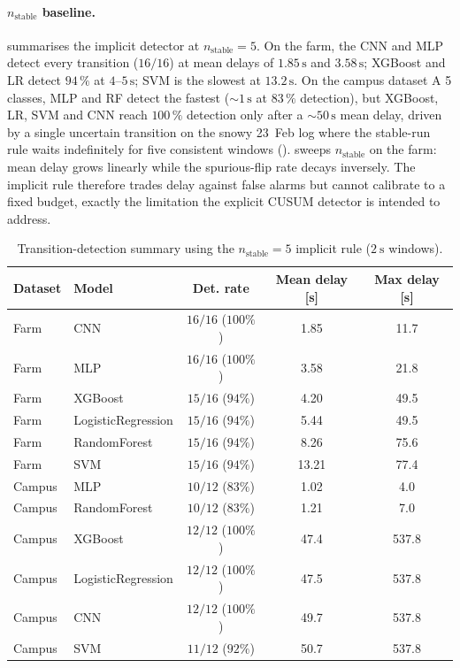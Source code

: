 \paragraph{$n_{\text{stable}}$ baseline.}  summarises the implicit detector at $n_{\text{stable}} = 5$. On the farm, the CNN and MLP detect every transition ($16/16$) at mean delays of $1.85\,\text{s}$ and $3.58\,\text{s}$; XGBoost and LR detect $94\,\%$ at $4$--$5\,\text{s}$; SVM is the slowest at $13.2\,\text{s}$. On the campus dataset A 5 classes, MLP and RF detect the fastest ($\sim 1\,\text{s}$ at $83\,\%$ detection), but XGBoost, LR, SVM and CNN reach $100\,\%$ detection only after a $\sim 50\,\text{s}$ mean delay, driven by a single uncertain transition on the snowy 23~Feb log where the stable-run rule waits indefinitely for five consistent windows ().  sweeps $n_{\text{stable}}$ on the farm: mean delay grows linearly while the spurious-flip rate decays inversely. The implicit rule therefore trades delay against false alarms but cannot calibrate to a fixed budget, exactly the limitation the explicit CUSUM detector is intended to address.

\vspace{-4mm}
\begin{table}[H]
\centering
\small
\caption{Transition-detection summary using the $n_{\text{stable}} = 5$ implicit rule ($\SI{2}{\second}$ windows).}
\label{tab:transition_nstable}
\begin{tabular}{llccc}
\toprule
\textbf{Dataset} & \textbf{Model} & \textbf{Det. rate} &
\textbf{Mean delay [s]} & \textbf{Max delay [s]} \\
\midrule
Farm    & CNN                & $16/16$ ($100\%$) & 1.85  & 11.7  \\
Farm    & MLP                & $16/16$ ($100\%$) & 3.58  & 21.8  \\
Farm    & XGBoost            & $15/16$ ($94\%$)  & 4.20  & 49.5  \\
Farm    & LogisticRegression & $15/16$ ($94\%$)  & 5.44  & 49.5  \\
Farm    & RandomForest       & $15/16$ ($94\%$)  & 8.26  & 75.6  \\
Farm    & SVM                & $15/16$ ($94\%$)  & 13.21 & 77.4  \\
\midrule
Campus  & MLP                & $10/12$ ($83\%$)  & 1.02  & 4.0   \\
Campus  & RandomForest       & $10/12$ ($83\%$)  & 1.21  & 7.0   \\
Campus  & XGBoost            & $12/12$ ($100\%$) & 47.4  & 537.8 \\
Campus  & LogisticRegression & $12/12$ ($100\%$) & 47.5  & 537.8 \\
Campus  & CNN                & $12/12$ ($100\%$) & 49.7  & 537.8 \\
Campus  & SVM                & $11/12$ ($92\%$)  & 50.7  & 537.8 \\
\bottomrule
\end{tabular}
\end{table}

